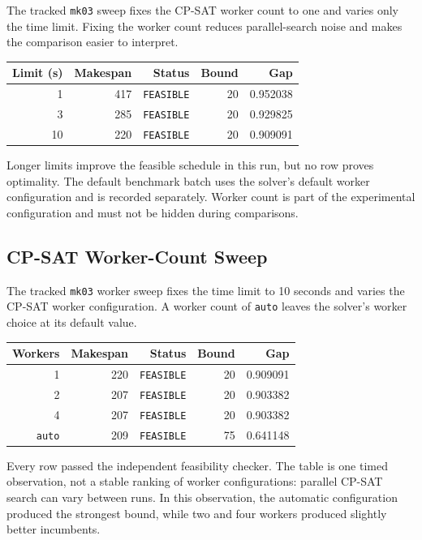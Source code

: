 ﻿\documentclass[11pt]{article}
\begin{document}
The tracked \texttt{mk03} sweep fixes the CP-SAT worker count to one and varies
only the time limit. Fixing the worker count reduces parallel-search noise and
makes the comparison easier to interpret.

\begin{table}[h]
\centering
\begin{tabular}{rrrrr}
\toprule
Limit (s) & Makespan & Status & Bound & Gap \\
\midrule
1 & 417 & \texttt{FEASIBLE} & 20 & 0.952038 \\
3 & 285 & \texttt{FEASIBLE} & 20 & 0.929825 \\
10 & 220 & \texttt{FEASIBLE} & 20 & 0.909091 \\
\bottomrule
\end{tabular}
\end{table}

Longer limits improve the feasible schedule in this run, but no row proves
optimality. The default benchmark batch uses the solver's default worker
configuration and is recorded separately. Worker count is part of the
experimental configuration and must not be hidden during comparisons.

\subsection{CP-SAT Worker-Count Sweep}

The tracked \texttt{mk03} worker sweep fixes the time limit to 10 seconds and
varies the CP-SAT worker configuration. A worker count of \texttt{auto} leaves
the solver's worker choice at its default value.

\begin{table}[h]
\centering
\begin{tabular}{rrrrr}
\toprule
Workers & Makespan & Status & Bound & Gap \\
\midrule
1 & 220 & \texttt{FEASIBLE} & 20 & 0.909091 \\
2 & 207 & \texttt{FEASIBLE} & 20 & 0.903382 \\
4 & 207 & \texttt{FEASIBLE} & 20 & 0.903382 \\
\texttt{auto} & 209 & \texttt{FEASIBLE} & 75 & 0.641148 \\
\bottomrule
\end{tabular}
\end{table}

Every row passed the independent feasibility checker. The table is one timed
observation, not a stable ranking of worker configurations: parallel CP-SAT
search can vary between runs. In this observation, the automatic
configuration produced the strongest bound, while two and four workers
produced slightly better incumbents.
\end{document}
